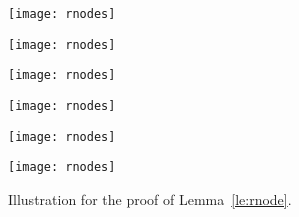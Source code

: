 \documentclass{article}
\begin{document}
\begin{figure}[t]
    \centering
    \begin{minipage}[b]{.31\textwidth}
    	\centering
    	\texttt{[image: rnodes]}
    	\subcaption{}\label{fi:rnodes-1}
    \end{minipage}
    \begin{minipage}[b]{.31\textwidth}
    	\centering
    	\texttt{[image: rnodes]}
    	\subcaption{}\label{fi:rnodes-2}
    \end{minipage}
    \begin{minipage}[b]{.31\textwidth}
    	\centering
    	\texttt{[image: rnodes]}
    	\subcaption{}\label{fi:rnodes-3}
    \end{minipage}
    \begin{minipage}[b]{.31\textwidth}
    	\centering
    	\texttt{[image: rnodes]}
    	\subcaption{}\label{fi:rnodes-4}
    \end{minipage}
    \begin{minipage}[b]{.31\textwidth}
    	\centering
    	\texttt{[image: rnodes]}
    	\subcaption{}\label{fi:rnodes-5}
    \end{minipage}
    \begin{minipage}[b]{.31\textwidth}
    	\centering
    	\texttt{[image: rnodes]}
    	\subcaption{}\label{fi:rnodes-6}
    \end{minipage}
    \caption{ Illustration for the proof of Lemma~\ref{le:rnode}.}
\end{figure}
\end{document}
